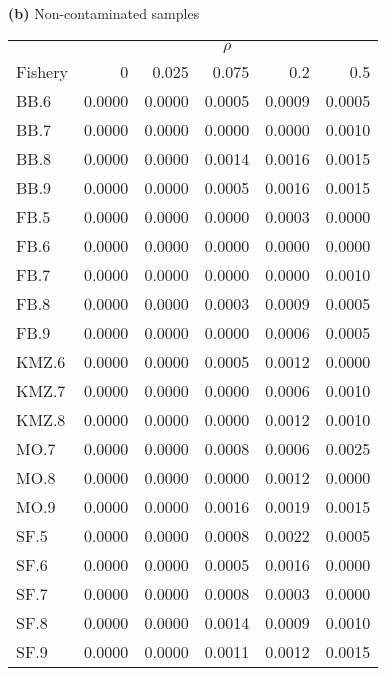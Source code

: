 {\bf (b)} Non-contaminated samples 
\begin{center}
\begin{tabular}{lrrrrr} 
  &  \multicolumn{5}{c}{\underline{$\rho$}} \\
Fishery       &  0             &  0.025         &  0.075         &  0.2           &  0.5           \\  
\hline BB.6  &  0.0000        &  0.0000        &  0.0005        &  0.0009        &  0.0005        \\  
BB.7          &  0.0000        &  0.0000        &  0.0000        &  0.0000        &  0.0010        \\  
BB.8          &  0.0000        &  0.0000        &  0.0014        &  0.0016        &  0.0015        \\  
BB.9          &  0.0000        &  0.0000        &  0.0005        &  0.0016        &  0.0015        \\  
FB.5          &  0.0000        &  0.0000        &  0.0000        &  0.0003        &  0.0000        \\  
FB.6          &  0.0000        &  0.0000        &  0.0000        &  0.0000        &  0.0000        \\  
FB.7          &  0.0000        &  0.0000        &  0.0000        &  0.0000        &  0.0010        \\  
FB.8          &  0.0000        &  0.0000        &  0.0003        &  0.0009        &  0.0005        \\  
FB.9          &  0.0000        &  0.0000        &  0.0000        &  0.0006        &  0.0005        \\  
KMZ.6         &  0.0000        &  0.0000        &  0.0005        &  0.0012        &  0.0000        \\  
KMZ.7         &  0.0000        &  0.0000        &  0.0000        &  0.0006        &  0.0010        \\  
KMZ.8         &  0.0000        &  0.0000        &  0.0000        &  0.0012        &  0.0010        \\  
MO.7          &  0.0000        &  0.0000        &  0.0008        &  0.0006        &  0.0025        \\  
MO.8          &  0.0000        &  0.0000        &  0.0000        &  0.0012        &  0.0000        \\  
MO.9          &  0.0000        &  0.0000        &  0.0016        &  0.0019        &  0.0015        \\  
SF.5          &  0.0000        &  0.0000        &  0.0008        &  0.0022        &  0.0005        \\  
SF.6          &  0.0000        &  0.0000        &  0.0005        &  0.0016        &  0.0000        \\  
SF.7          &  0.0000        &  0.0000        &  0.0008        &  0.0003        &  0.0000        \\  
SF.8          &  0.0000        &  0.0000        &  0.0014        &  0.0009        &  0.0010        \\  
SF.9          &  0.0000        &  0.0000        &  0.0011        &  0.0012        &  0.0015        \\  
\end{tabular} 
\end{center}
